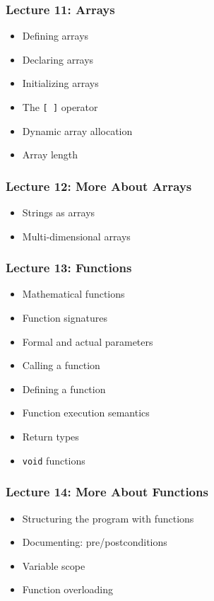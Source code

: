 \begin{frame}
\frametitle{Lecture 11: Arrays}

{\Large
\begin{itemize}
	\item Defining arrays
	\item Declaring arrays
	\item Initializing arrays
	\item The \texttt{[~]} operator
	\item Dynamic array allocation
	\item Array length
	
\end{itemize}
}

\end{frame}


\begin{frame}
\frametitle{Lecture 12: More About Arrays}

{\Large
\begin{itemize}
	\item Strings as arrays
	\item Multi-dimensional arrays
\end{itemize}
}

\end{frame}


\begin{frame}
\frametitle{Lecture 13: Functions}

{\Large
\begin{itemize}
	\item Mathematical functions
	\item Function signatures
	\item Formal and actual parameters
	\item Calling a function
	\item Defining a function
	\item Function execution semantics
	\item Return types
	\item \texttt{void} functions
	
	
\end{itemize}
}

\end{frame}

\begin{frame}
\frametitle{Lecture 14: More About Functions}

{\Large
\begin{itemize}
	\item Structuring the program with functions	
	\item Documenting: pre/postconditions
	\item Variable scope
	\item Function overloading
\end{itemize}
}

\end{frame}

